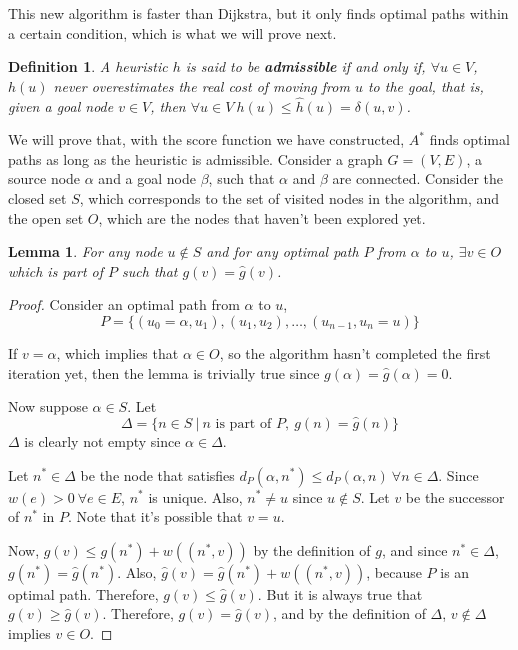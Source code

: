 \documentclass[12pt]{report}
\newtheorem{definition}[theorem]{Definition}
\newtheorem{lemma}[theorem]{Lemma}
\begin{document}
This new algorithm is faster than Dijkstra, but it only finds optimal paths within a certain condition, which is what we will prove next.

\begin{definition}
A heuristic $h$ is said to be \textbf{admissible} if and only if, $\forall u \in V$, $h(u)$ never overestimates the real cost of moving from $u$ to the goal, that is, given a goal node $v \in V$, then $\forall u \in V \ h(u) \le \hat{h}(u) = \delta(u, v)$.
\end{definition}

We will prove that, with the score function we have constructed, $A^*$ finds optimal paths as long as the heuristic is admissible. Consider a graph $G = (V, E)$, a source node $\alpha$ and a goal node $\beta$, such that $\alpha$ and $\beta$ are connected. Consider the closed set $S$, which corresponds to the set of visited nodes in the algorithm, and the open set $O$, which are the nodes that haven't been explored yet.

\begin{lemma}
\label{lemma:astar1}
 For any node $u \not \in S$ and for any optimal path $P$ from $\alpha$ to $u$, $\exists v \in O$ which is part of $P$ such that $g(v) = \hat{g}(v)$.
\end{lemma}
\begin{proof}
Consider an optimal path from $\alpha$ to $u$,
\[P = \{ (u_0 = \alpha, u_1), (u_1, u_2), \dots, (u_{n-1}, u_n = u) \}\]

If $v = \alpha$, which implies that $\alpha \in O$, so the algorithm hasn't completed the first iteration yet, then the lemma is trivially true since $g(\alpha) = \hat{g}(\alpha) = 0$.

Now suppose $\alpha \in S$. Let
\[ \Delta = \{ n \in S \  | \  n \text{ is part of } P,\  g(n) = \hat{g}(n) \} \]
$\Delta$ is clearly not empty since $\alpha \in \Delta$.

Let $n^* \in \Delta$ be the node that satisfies $d_P(\alpha, n^*) \leq d_P(\alpha, n) \  \forall n \in \Delta$. Since $w(e) > 0\  \forall e \in E$, $n^*$ is unique. Also, $n^* \neq u$ since $u \not \in S$. Let $v$ be the successor of $n^*$ in $P$. Note that it's possible that $v = u$.

Now, $g(v) \leq g(n^*) + w((n^*, v))$ by the definition of $g$, and since $n^* \in \Delta$, $g(n^*) = \hat{g}(n^*)$. Also, $\hat{g}(v) = \hat{g}(n^*) + w((n^*, v))$, because $P$ is an optimal path. Therefore, $g(v) \leq \hat{g}(v)$. But it is always true that $g(v) \geq \hat{g}(v)$. Therefore, $g(v) = \hat{g}(v)$, and by the definition of $\Delta$, $v \not \in \Delta$ implies $v \in O$.
\end{proof}
\end{document}
